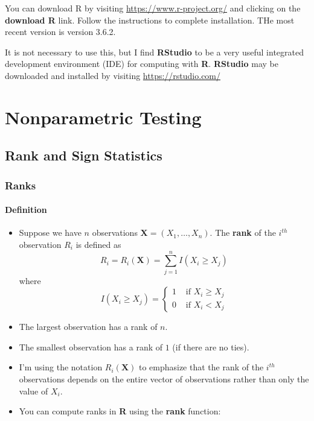 \documentclass[]{book}
\begin{document}
You can download R by visiting \url{https://www.r-project.org/} and clicking on the \textbf{download R} link. Follow the instructions
to complete installation. THe most recent version is version 3.6.2.

It is not necessary to use this, but I find \textbf{RStudio} to be a very useful integrated development environment (IDE)
for computing with \textbf{R}. \textbf{RStudio} may be downloaded and installed by visiting \url{https://rstudio.com/}

\hypertarget{part-nonparametric-testing}{%
\part{Nonparametric Testing}\label{part-nonparametric-testing}}

\hypertarget{rank-tests}{%
\chapter{Rank and Sign Statistics}\label{rank-tests}}

\hypertarget{ranks}{%
\section{Ranks}\label{ranks}}

\hypertarget{definition}{%
\subsection{Definition}\label{definition}}

\begin{itemize}
\item
  Suppose we have \(n\) observations \(\mathbf{X} = (X_{1}, \ldots, X_{n})\). The \textbf{rank} of the \(i^{th}\) observation \(R_{i}\) is defined as
  \begin{equation}
  R_{i} = R_{i}(\mathbf{X}) = \sum_{j=1}^{n} I( X_{i} \geq X_{j}) 
  \label{eq:rankdef}
  \end{equation}
  where
  \begin{equation}
  I(X_{i} \geq X_{j}) 
  = \begin{cases}
  1 & \text{ if } X_{i} \geq X_{j} \\
  0 & \text{ if } X_{i} < X_{j}
  \end{cases}
  \end{equation}
\item
  The largest observation has a rank of \(n\).
\item
  The smallest observation has a rank of \(1\) (if there are no ties).
\item
  I'm using the notation \(R_{i}(\mathbf{X})\) to emphasize that the rank
  of the \(i^{th}\) observations depends on the entire vector of observations
  rather than only the value of \(X_{i}\).
\item
  You can compute ranks in \textbf{R} using the \textbf{rank} function:
\end{itemize}
\end{document}
